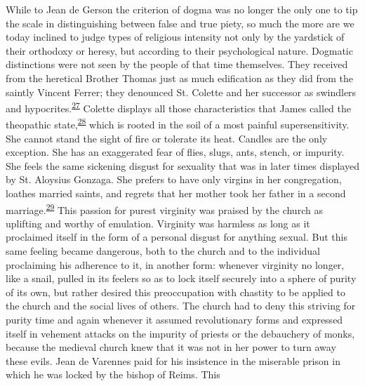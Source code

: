 While to Jean de Gerson the criterion of dogma was no longer the only
one to tip the scale in distinguishing between false and true piety, so
much the more are we today inclined to judge types
\protect\hypertarget{15_Chapter_Eight__RELIGIOUS_EXCITAT.xhtmlux5cux23page_226}{}{}of
religious intensity not only by the yardstick of their orthodoxy or
heresy, but according to their psychological nature. Dogmatic
distinctions were not seen by the people of that time themselves. They
received from the heretical Brother Thomas just as much edification as
they did from the saintly Vincent Ferrer; they denounced St. Colette and
her successor as swindlers and
hypocrites.\textsuperscript{\protect\hypertarget{15_Chapter_Eight__RELIGIOUS_EXCITAT.xhtmlux5cux23id_853}{\protect\hyperlink{23_NOTES.xhtmlux5cux23id_854}{27}}}
Colette displays all those characteristics that James called the
theopathic
state,\textsuperscript{\protect\hypertarget{15_Chapter_Eight__RELIGIOUS_EXCITAT.xhtmlux5cux23id_851}{\protect\hyperlink{23_NOTES.xhtmlux5cux23id_852}{28}}}
which is rooted in the soil of a most painful supersensitivity. She
cannot stand the sight of fire or tolerate its heat. Candles are the
only exception. She has an exaggerated fear of flies, slugs, ants,
stench, or impurity. She feels the same sickening disgust for sexuality
that was in later times displayed by St. Aloysius Gonzaga. She prefers
to have only virgins in her congregation, loathes married saints, and
regrets that her mother took her father in a second
marriage.\textsuperscript{\protect\hypertarget{15_Chapter_Eight__RELIGIOUS_EXCITAT.xhtmlux5cux23id_849}{\protect\hyperlink{23_NOTES.xhtmlux5cux23id_850}{29}}}
This passion for purest virginity was praised by the church as uplifting
and worthy of emulation. Virginity was harmless as long as it proclaimed
itself in the form of a personal disgust for anything sexual. But this
same feeling became dangerous, both to the church and to the individual
proclaiming his adherence to it, in another form: whenever virginity no
longer, like a snail, pulled in its feelers so as to lock itself
securely into a sphere of purity of its own, but rather desired this
preoccupation with chastity to be applied to the church and the social
lives of others. The church had to deny this striving for purity time
and again whenever it assumed revolutionary forms and expressed itself
in vehement attacks on the impurity of priests or the debauchery of
monks, because the medieval church knew that it was not in her power to
turn away these evils. Jean de Varennes paid for his insistence in the
miserable prison in which he was locked by the bishop of Reims. This
